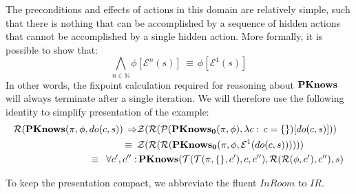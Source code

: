 The preconditions and effects of actions in this domain are relatively
simple, such that there is nothing that can be accomplished by a sequence
of hidden actions that cannot be accomplished by a single hidden action.
More formally, it is possible to show that:\[
\bigwedge_{n\in\mathbb{N}}\phi[\mathcal{E}^{n}(s)]\,\equiv\,\phi[\mathcal{E}^{1}(s)]\]
 In other words, the fixpoint calculation required for reasoning about
$\mathbf{PKnows}$ will always terminate after a single iteration. We will
therefore use the following identity to simplify presentation of the
example:\begin{align*}
\mathcal{R}(\mathbf{PKnows}(\pi,\phi,do(c,s))\,\Rightarrow & \mathcal{Z}(\mathcal{R}(\mathcal{P}(\mathbf{PKnows_{0}}(\pi,\phi),\lambda c:\, c=\{\})[do(c,s)]))\\
\equiv\,\,\, & \mathcal{Z}(\mathcal{R}(\mathcal{R}(\mathbf{PKnows_{0}}(\pi,\phi,\mathcal{E}^{1}(do(c,s))))))\\
\equiv\,\,\,\forall c',c'': & \,\mathbf{PKnows}(\mathcal{T}(\mathcal{T}(\pi,\{\},c'),c,c''),\mathcal{R}(\mathcal{R}(\phi,c'),c''),s)\end{align*}


To keep the presentation compact, we abbreviate the fluent $InRoom$
to $IR$.

